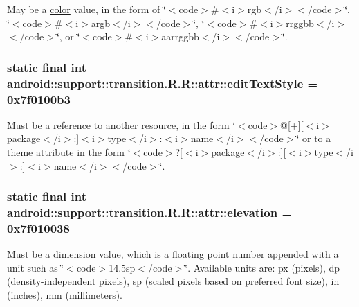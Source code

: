 May be a \hyperlink{classandroid_1_1support_1_1transition_1_1_r_1_1color}{color} value, in the form of \char`\"{}$<$code$>$\#$<$i$>$rgb$<$/i$>$$<$/code$>$\char`\"{}, \char`\"{}$<$code$>$\#$<$i$>$argb$<$/i$>$$<$/code$>$\char`\"{}, \char`\"{}$<$code$>$\#$<$i$>$rrggbb$<$/i$>$$<$/code$>$\char`\"{}, or \char`\"{}$<$code$>$\#$<$i$>$aarrggbb$<$/i$>$$<$/code$>$\char`\"{}. \hypertarget{classandroid_1_1support_1_1transition_1_1_r_1_1attr_b127d1f78699d5d93253a1d6b334193a}{
\subsubsection[{editTextStyle}]{\setlength{\rightskip}{0pt plus 5cm}static final int android::support::transition.R.R::attr::editTextStyle = 0x7f0100b3}}
\label{classandroid_1_1support_1_1transition_1_1_r_1_1attr_b127d1f78699d5d93253a1d6b334193a}


Must be a reference to another resource, in the form \char`\"{}$<$code$>$@\mbox{[}+\mbox{]}\mbox{[}$<$i$>$package$<$/i$>$:\mbox{]}$<$i$>$type$<$/i$>$:$<$i$>$name$<$/i$>$$<$/code$>$\char`\"{} or to a theme attribute in the form \char`\"{}$<$code$>$?\mbox{[}$<$i$>$package$<$/i$>$:\mbox{]}\mbox{[}$<$i$>$type$<$/i$>$:\mbox{]}$<$i$>$name$<$/i$>$$<$/code$>$\char`\"{}. \hypertarget{classandroid_1_1support_1_1transition_1_1_r_1_1attr_9912a117bca7ecf61653c6e30964055a}{
\subsubsection[{elevation}]{\setlength{\rightskip}{0pt plus 5cm}static final int android::support::transition.R.R::attr::elevation = 0x7f010038}}
\label{classandroid_1_1support_1_1transition_1_1_r_1_1attr_9912a117bca7ecf61653c6e30964055a}


Must be a dimension value, which is a floating point number appended with a unit such as \char`\"{}$<$code$>$14.5sp$<$/code$>$\char`\"{}. Available units are: px (pixels), dp (density-independent pixels), sp (scaled pixels based on preferred font size), in (inches), mm (millimeters). 

